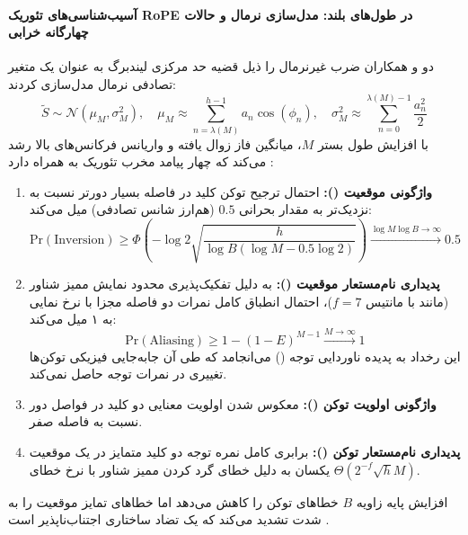 \paragraph*{آسیب‌شناسی‌های تئوریک RoPE در طول‌های بلند: مدل‌سازی نرمال و حالات چهارگانه خرابی}
دو و همکاران \cite{du2026rope} ضرب غیرنرمال  را ذیل قضیه حد مرکزی لیندبرگ به عنوان یک متغیر تصادفی نرمال مدل‌سازی کردند:
\begin{equation}
    \tilde{S} \sim \mathcal{N}\left( \mu_M, \sigma_M^2 \right), \quad \mu_M \approx \sum_{n=\lambda(M)}^{h-1} a_n \cos(\phi_n), \quad \sigma_M^2 \approx \sum_{n=0}^{\lambda(M)-1} \frac{a_n^2}{2}
\end{equation}
با افزایش طول بستر $M$، میانگین فاز زوال یافته و واریانس فرکانس‌های بالا رشد می‌کند که چهار پیامد مخرب تئوریک به همراه دارد \cite{du2026rope}:
\begin{enumerate}
    \item \textbf{واژگونی موقعیت ():} احتمال ترجیح توکن کلید در فاصله بسیار دورتر نسبت به نزدیک‌تر به مقدار بحرانی $0.5$ (هم‌ارز شانس تصادفی) میل می‌کند:
    \begin{equation}
        \text{Pr}(\text{Inversion}) \ge \Phi\left( -\log 2 \sqrt{\frac{h}{\log B (\log M - 0.5 \log 2)}} \right) \xrightarrow{\log M \log B \to \infty} 0.5
    \end{equation}
    \item \textbf{پدیداری نام‌مستعار موقعیت ():} به دلیل تفکیک‌پذیری محدود نمایش ممیز شناور (مانند  با مانتیس $f=7$)، احتمال انطباق کامل نمرات دو فاصله مجزا با نرخ نمایی به ۱ میل می‌کند:
    \begin{equation}
        \text{Pr}(\text{Aliasing}) \ge 1 - (1 - E)^{M-1} \xrightarrow{M \to \infty} 1
    \end{equation}
    این رخداد به پدیده ناوردایی توجه () می‌انجامد که طی آن جابه‌جایی فیزیکی توکن‌ها تغییری در نمرات توجه حاصل نمی‌کند.
    \item \textbf{واژگونی اولویت توکن ():} معکوس شدن اولویت معنایی دو کلید در فواصل دور نسبت به فاصله صفر.
    \item \textbf{پدیداری نام‌مستعار توکن ():} برابری کامل نمره توجه دو کلید متمایز در یک موقعیت یکسان به دلیل خطای گرد کردن ممیز شناور با نرخ خطای $\Theta(2^{-f}\sqrt{h}M)$.
\end{enumerate}
افزایش پایه زاویه $B$ خطاهای توکن را کاهش می‌دهد اما خطاهای تمایز موقعیت را به شدت تشدید می‌کند که یک تضاد ساختاری اجتناب‌ناپذیر است \cite{du2026rope}.

